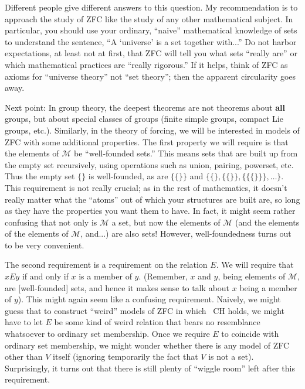 \documentclass[10pt]{article}
\newcommand\axiom[1]{\textmd{#1}}
\theoremstyle{definition}
\begin{document}
Different people give different answers to this question. My recommendation is to approach the study of \axiom{ZFC} like the study of any other mathematical subject. In particular, you should use your ordinary, ``naive'' mathematical knowledge of sets to understand the sentence, ``A `universe' is a set together with...'' Do not harbor expectations, at least not at first, that \axiom{ZFC} will tell you what sets ``really are'' or which mathematical practices are ``really rigorous.'' If it helps, think of \axiom{ZFC} as axioms for ``universe theory'' not ``set theory''; then the apparent circularity goes away.

Next point: In group theory, the deepest theorems are not theorems about \textbf{all} groups, but about special classes of groups (finite simple groups, compact Lie groups, etc.). Similarly, in the theory of forcing, we will be interested in models of \axiom{ZFC} with some additional properties. The first property we will require is that the elements of $\mathcal M$ be ``well-founded sets.'' This means sets that are built up from the empty set recursively, using operations such as union, pairing, powerset, etc. Thus the empty set $\{\}$ is well-founded, as are $\{\{\}\}$ and $\{\{\}, \{\{\}\}, \{\{\{\}\}\}, \ldots\}$. This requirement is not really crucial; as in the rest of mathematics, it doesn't really matter what the ``atoms'' out of which your structures are built are, so long as they have the properties you want them to have. In fact, it might seem rather confusing that not only is $\mathcal M$ a set, but now the elements of $\mathcal M$ (and the elements of the elements of $\mathcal M$, and...) are also sets! However, well-foundedness turns out to be very convenient.

The second requirement is a requirement on the relation $E$. We will require that $x E y$ if and only if $x$ is a member of $y$. (Remember, $x$ and $y$, being elements of $\mathcal M$, are [well-founded] sets, and hence it makes sense to talk about $x$ being a member of $y$). This might again seem like a confusing requirement. Naively, we might guess that to construct ``weird'' models of \axiom{ZFC} in which \axiom{~CH} holds, we might have to let $E$ be some kind of weird relation that bears no resemblance whatsoever to ordinary set membership. Once we require $E$ to coincide with ordinary set membership, we might wonder whether there is any model of \axiom{ZFC} other than $V$ itself (ignoring temporarily the fact that $V$ is not a set). Surprisingly, it turns out that there is still plenty of ``wiggle room'' left after this requirement.
\end{document}
